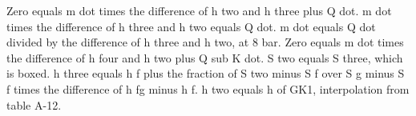 Zero equals m dot times the difference of h two and h three plus Q dot. 
m dot times the difference of h three and h two equals Q dot. 
m dot equals Q dot divided by the difference of h three and h two, at 8 bar. 
Zero equals m dot times the difference of h four and h two plus Q sub K dot. 
S two equals S three, which is boxed. 
h three equals h f plus the fraction of S two minus S f over S g minus S f times the difference of h fg minus h f. 
h two equals h of GK1, interpolation from table A-12.